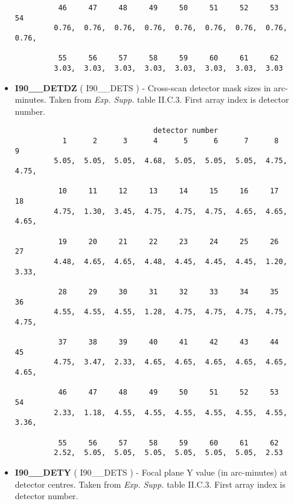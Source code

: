 \begin{itemize}
\begin{minipage}[t]{\textwidth}
\begin{verbatim}
          46     47     48     49     50     51     52     53     54
         0.76,  0.76,  0.76,  0.76,  0.76,  0.76,  0.76,  0.76,  0.76,

          55     56     57     58     59     60     61     62
         3.03,  3.03,  3.03,  3.03,  3.03,  3.03,  3.03,  3.03

\end{verbatim}
\normalsize
\end{minipage}

\item {\bf I90\_\_DETDZ} ( I90\_\_DETS ) -   Cross-scan detector mask sizes in arc-minutes.
Taken from {\em Exp. Supp.}  table II.C.3. First array index is detector number.

\begin{minipage}[t]{\textwidth}
\small
\begin{verbatim}
                                detector number
           1      2      3      4      5      6      7      8      9
         5.05,  5.05,  5.05,  4.68,  5.05,  5.05,  5.05,  4.75,  4.75,

          10     11     12     13     14     15     16     17     18
         4.75,  1.30,  3.45,  4.75,  4.75,  4.75,  4.65,  4.65,  4.65,

          19     20     21     22     23     24     25     26     27
         4.48,  4.65,  4.65,  4.48,  4.45,  4.45,  4.45,  1.20,  3.33,

          28     29     30     31     32     33     34     35     36
         4.55,  4.55,  4.55,  1.28,  4.75,  4.75,  4.75,  4.75,  4.75,

          37     38     39     40     41     42     43     44     45
         4.75,  3.47,  2.33,  4.65,  4.65,  4.65,  4.65,  4.65,  4.65,

          46     47     48     49     50     51     52     53     54
         2.33,  1.18,  4.55,  4.55,  4.55,  4.55,  4.55,  4.55,  3.36,

          55     56     57     58     59     60     61     62
         2.52,  5.05,  5.05,  5.05,  5.05,  5.05,  5.05,  2.53

\end{verbatim}
\normalsize
\end{minipage}

\item {\bf I90\_\_DETY} ( I90\_\_DETS ) -    Focal plane Y value (in arc-minutes) at
detector centres. Taken from {\em Exp. Supp.} table II.C.3. First array index is detector number.


\end{itemize}
